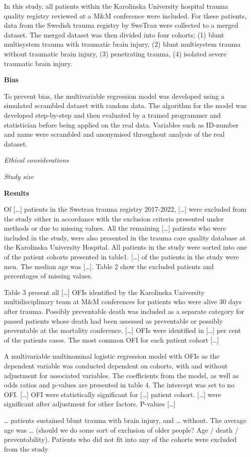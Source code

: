 \documentclass[
]{article}
\begin{document}
In this study, all patients within the Karolinska University hospital
trauma quality registry reviewed at a M\&M conference were included. For
these patients, data from the Swedish trauma registry by SweTrau were
collected to a merged dataset. The merged dataset was then divided into
four cohorts; (1) blunt multisystem trauma with traumatic brain injury,
(2) blunt multisystem trauma without traumatic brain injury, (3)
penetrating trauma, (4) isolated severe traumatic brain injury.

\textbf{Bias}

To prevent bias, the multivariable regression model was developed using
a simulated scrambled dataset with random data. The algorithm for the
model was developed step-by-step and then evaluated by a trained
programmer and statistician before being applied on the real data.
Variables such as ID-number and name were scrambled and anonymised
throughout analysis of the real dataset.

\emph{Ethical considerations}

\emph{Study size}

\textbf{Results}

Of {[}\ldots{]} patients in the Swetrau trauma registry 2017-2022,
{[}\ldots{]} were excluded from the study either in accordance with the
exclusion criteria presented under methods or due to missing values. All
the remaining {[}\ldots{]} patients who were included in the study, were
also presented in the trauma care quality database at the Karolinska
University Hospital. All patients in the study were sorted into one of
the patient cohorts presented in table1. {[}\ldots{]} of the patients in
the study were men. The median age was {[}\ldots{]}. Table 2 show the
excluded patients and percentages of missing values.

Table 3 present all {[}\ldots{]} OFIs identified by the Karolinska
University multidisciplinary team at M\&M conferences for patients who
were alive 30 days after trauma. Possibly preventable death was included
as a separate category for passed patients whose death had been assessed
as preventable or possibly preventable at the mortality conference.
{[}\ldots{]} OFIs were identified in {[}\ldots{]} per cent of the
patients cases. The most common OFI for each patient cohort {[}\ldots{]}

A multivariable multinominal logistic regression model with OFIs as the
dependent variable was conducted dependent on cohorts, with and without
adjustment for associated variables. The coefficients from the model, as
well as odds ratios and p-values are presented in table 4. The intercept
was set to no OFI. {[}\ldots{]} OFI were statistically significant for
{[}\ldots{]} patient cohort. {[}\ldots{]} were significant after
adjustment for other factors. P-values {[}\ldots{]}

\ldots{} patients sustained blunt trauma with brain injury, and \ldots{}
without. The average age was \ldots{} (should we do some sort of
exclusion of older people? Age / death / preventability). Patients who
did not fit into any of the cohorts were excluded from the study
\end{document}
